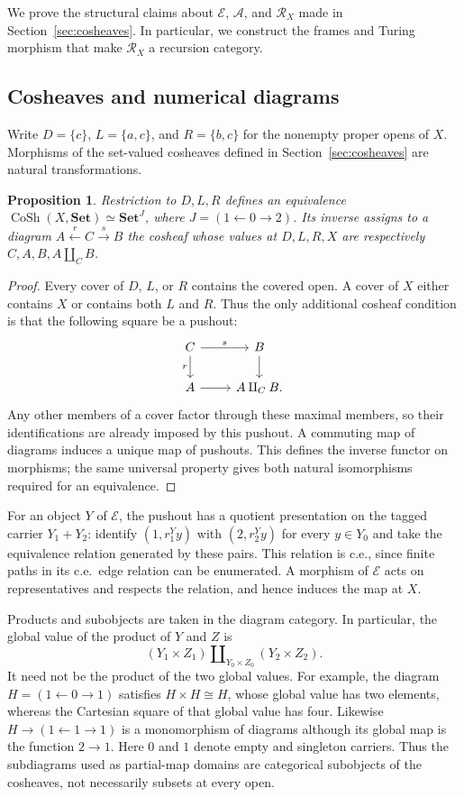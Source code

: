 \documentclass[11pt]{article}
\newtheorem{proposition}[theorem]{Proposition}
\begin{document}
We prove the structural claims about $\mathcal E$, $\mathcal A$, and
$\mathscr R_X$ made in Section~\ref{sec:cosheaves}. In particular,
we construct the frames and Turing morphism that make
$\mathscr R_X$ a recursion category.

\subsection{Cosheaves and numerical diagrams}

Write $D=\{c\}$, $L=\{a,c\}$, and $R=\{b,c\}$ for the nonempty
proper opens of $X$. Morphisms of the set-valued cosheaves defined in
Section~\ref{sec:cosheaves} are natural transformations.

\begin{proposition}\label{prop:fork-cosheaves}
Restriction to $D,L,R$ defines an equivalence
$\operatorname{CoSh}(X,\mathbf{Set})\simeq\mathbf{Set}^{J}$,
where $J=(1\leftarrow0\to2)$. Its inverse assigns to a diagram
$A\xleftarrow{r}C\xrightarrow{s}B$ the cosheaf whose values at
$D,L,R,X$ are respectively $C,A,B,A\amalg_C B$.
\end{proposition}
\begin{proof}
Every cover of $D$, $L$, or $R$ contains the covered open. A cover
of $X$ either contains $X$ or contains both $L$ and $R$. Thus the
only additional cosheaf condition is that the following square be
a pushout:
\[
\begin{tikzcd}
C\arrow[r,"s"]\arrow[d,"r"']&B\arrow[d]\\
A\arrow[r]&A\amalg_C B.
\end{tikzcd}
\]
Any other members of a cover factor through these maximal members,
so their identifications are already imposed by this pushout.
A commuting map of diagrams induces a unique map of pushouts.
This defines the inverse functor on morphisms; the same universal
property gives both natural isomorphisms required for an equivalence.
\end{proof}

For an object $Y$ of $\mathcal E$, the pushout has a
quotient presentation on the tagged carrier $Y_1+Y_2$: identify
$(1,r_1^Yy)$ with $(2,r_2^Yy)$ for every $y\in Y_0$ and take the
equivalence relation generated by these pairs. This relation is c.e.,
since finite paths in its c.e.\ edge relation can be enumerated.
A morphism of $\mathcal E$ acts on representatives and respects the
relation, and hence induces the map at $X$.

Products and subobjects are taken in the diagram category. In
particular, the global value of the product of $Y$ and $Z$ is
\[
 (Y_1\times Z_1)\amalg_{Y_0\times Z_0}(Y_2\times Z_2).
\]
It need not be the product of the two global values. For example,
the diagram $H=(1\leftarrow0\to1)$ satisfies $H\times H\cong H$,
whose global value has two elements, whereas the Cartesian square
of that global value has four. Likewise $H\to(1\leftarrow1\to1)$ is a monomorphism
of diagrams although its global map is the function $2\to1$.
Here $0$ and $1$ denote empty and singleton carriers. Thus the
subdiagrams used as partial-map domains are categorical subobjects
of the cosheaves, not necessarily subsets at every open.
\end{document}
